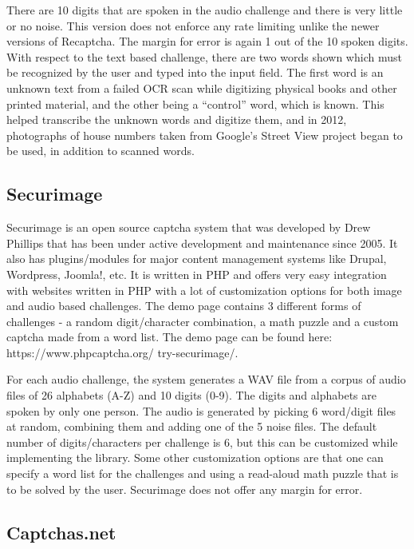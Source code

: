 There are 10 digits that are spoken in the audio challenge and there is very little or no noise. This 
version does not enforce any rate limiting unlike the newer versions of Recaptcha. The margin for error 
is again 1 out of the 10 spoken digits. With respect to the text based challenge, there are two words 
shown which must be recognized by the user and typed into the input field. The first word is an unknown 
text from a failed OCR scan while digitizing physical books and other printed material, and the other 
being a ``control'' word, which is known. This helped transcribe the unknown words and digitize them, and 
in 2012, photographs of house numbers taken from Google's Street View project began to be used, in 
addition to scanned words. 

\subsection{Securimage}

Securimage is an open source captcha system that was developed by Drew Phillips that has 
been under active development and maintenance since 2005. It also has plugins/modules for 
major content management systems like Drupal, Wordpress, Joomla!, etc. It is written in PHP 
and offers very easy integration with websites written in PHP with a lot of customization 
options for both image and audio based challenges. The demo page contains 3 different forms 
of challenges - a random digit/character combination, a math puzzle and a custom captcha 
made from a word list. The demo page can be found here: https://www.phpcaptcha.org/
try-securimage/.

For each audio challenge, the system generates a WAV file from a corpus of audio files of 26 
alphabets (A-Z) and 10 digits (0-9). The digits and alphabets are spoken by only one person. 
The audio is generated by picking 6 word/digit files at random, combining them and adding one 
of the 5 noise files. The default number of digits/characters per challenge is 6, but this can 
be customized while implementing the library. Some other customization options are that one can 
specify a word list for the challenges and using a read-aloud math puzzle that is to be solved 
by the user. Securimage does not offer any margin for error.

\subsection{Captchas.net}

